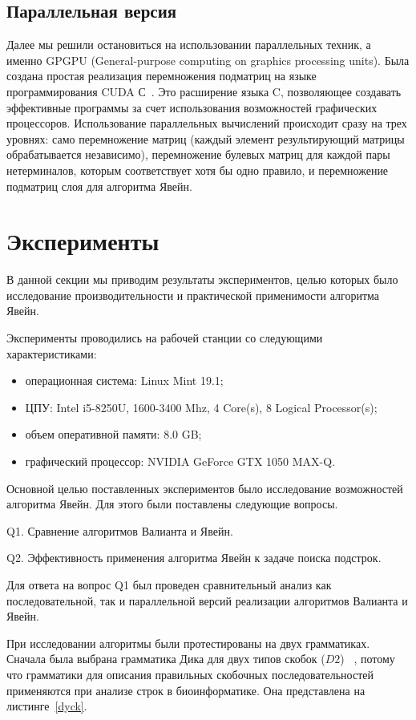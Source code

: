 \documentclass[14pt]{matmex-diploma-custom}
\begin{document}
\subsection{Параллельная версия}

Далее мы решили остановиться на использовании параллельных техник, а именно GPGPU (General-purpose computing on graphics processing units). Была создана простая реализация перемножения подматриц на языке программирования CUDA С~\cite{nvidia2011nvidia}. Это расширение языка C, позволяющее создавать эффективные программы за счет использования возможностей графических процессоров.  Использование параллельных вычислений происходит сразу на трех уровнях: само перемножение матриц (каждый элемент результирующий матрицы обрабатывается независимо), перемножение булевых матриц для каждой пары нетерминалов, которым соответствует хотя бы одно правило, и перемножение подматриц слоя для алгоритма Явейн. 


\section{Эксперименты}

В данной секции мы приводим результаты экспериментов, целью которых было исследование производительности и практической применимости алгоритма Явейн.

Эксперименты проводились на рабочей станции со следующими характеристиками:
\begin{itemize}
    \item операционная система: Linux Mint 19.1;
    \item ЦПУ: Intel i5-8250U, 1600-3400 Mhz, 4 Core(s), 8 Logical Processor(s);
    \item объем оперативной памяти: 8.0 GB;
    \item графический процессор: NVIDIA GeForce GTX 1050 MAX-Q.
\end{itemize}

Основной целью поставленных экспериментов было исследование возможностей алгоритма Явейн.
Для этого были поставлены следующие вопросы.

Q1. Сравнение алгоритмов Валианта и Явейн.

Q2. Эффективность применения алгоритма Явейн к задаче поиска подстрок.

Для ответа на вопрос Q1 был проведен сравнительный анализ как последовательной, так и параллельной версий реализации алгоритмов Валианта и Явейн. 

При исследовании алгоритмы были протестированы на двух грамматиках. Сначала была выбрана грамматика Дика для двух типов скобок ($D2$) ~\cite{hopcroft1969formal}, потому что грамматики для описания правильных скобочных последовательностей применяются при анализе строк в биоинформатике. Она представлена на листинге~\ref{dyck}.  
\end{document}
